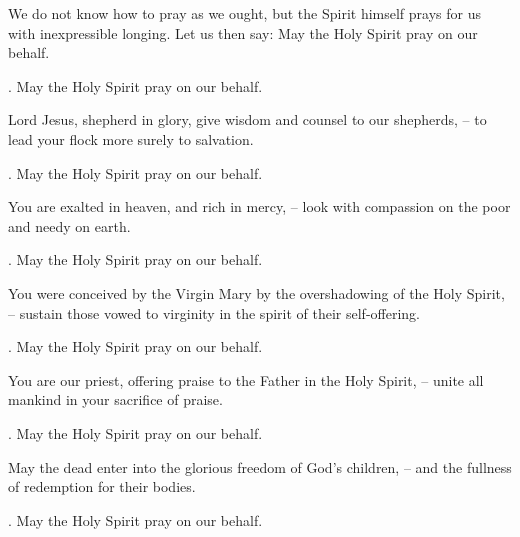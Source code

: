 \lettrine[lines=2]{W}{}e do not know how to pray as we ought, but the Spirit himself prays for us with inexpressible longing. Let us then say: May the Holy Spirit pray on our behalf.
\par \Rbar. May the Holy Spirit pray on our behalf.

Lord Jesus, shepherd in glory, give wisdom and counsel to our shepherds,
– to lead your flock more surely to salvation.
\par \Rbar. May the Holy Spirit pray on our behalf.

You are exalted in heaven, and rich in mercy,
– look with compassion on the poor and needy on earth.
\par \Rbar. May the Holy Spirit pray on our behalf.

You were conceived by the Virgin Mary by the overshadowing of the Holy Spirit,
– sustain those vowed to virginity in the spirit of their self-offering.
\par \Rbar. May the Holy Spirit pray on our behalf.

You are our priest, offering praise to the Father in the Holy Spirit,
– unite all mankind in your sacrifice of praise.
\par \Rbar. May the Holy Spirit pray on our behalf.

May the dead enter into the glorious freedom of God’s children,
– and the fullness of redemption for their bodies.
\par \Rbar. May the Holy Spirit pray on our behalf.